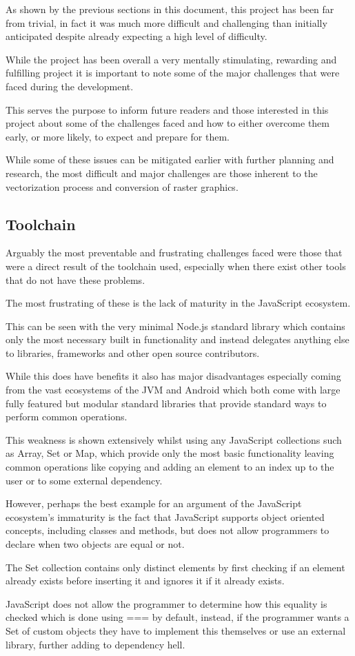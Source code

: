 \documentclass[12pt]{article}
\newcommand{\sentence}{} %
\begin{document}
    \tab
    As shown by the previous sections in this document, this project has been far from trivial, in fact it was much
    more difficult and challenging than initially anticipated despite already expecting a high level of difficulty.
    \sentence
    While the project has been overall a very mentally stimulating, rewarding and fulfilling project it is important
    to note some of the major challenges that were faced during the development.
    \sentence
    This serves the purpose to inform future readers and those interested in this project about some of the
    challenges faced and how to either overcome them early, or more likely, to expect and prepare for them.
    \sentence
    While some of these issues can be mitigated earlier with further planning and research, the most difficult and
    major challenges are those inherent to the vectorization process and conversion of raster graphics.

    \subsection{Toolchain}\label{subsec:toolchain2}

    \tab
    Arguably the most preventable and frustrating challenges faced were those that were a direct result of the
    toolchain used, especially when there exist other tools that do not have these problems.
    \sentence
    The most frustrating of these is the lack of maturity in the JavaScript ecosystem.
    \sentence
    This can be seen with the very minimal Node.js standard library which contains only the most necessary built in
    functionality and instead delegates anything else to libraries, frameworks and other open source contributors.
    \sentence
    While this does have benefits it also has major disadvantages especially coming from the vast ecosystems of the
    JVM and Android which both come with large fully featured but modular standard libraries that provide standard
    ways to perform common operations.
    \sentence
    This weakness is shown extensively whilst using any JavaScript collections such as Array, Set or Map, which
    provide only the most basic functionality leaving common operations like copying and adding an element to an
    index up to the user or to some external dependency.
    \sentence
    However, perhaps the best example for an argument of the JavaScript ecosystem's immaturity is the fact that
    JavaScript supports object oriented concepts, including classes and methods, but does not allow programmers to
    declare when two objects are equal or not.
    \sentence
    The Set collection contains only distinct elements by first checking if an element already exists before
    inserting it and ignores it if it already exists.
    \sentence
    JavaScript does not allow the programmer to determine how this equality is checked which is done using === by
    default, instead, if the programmer wants a Set of custom objects they have to implement this themselves or
    use an external library, further adding to dependency hell.
    \sentence
\end{document}
